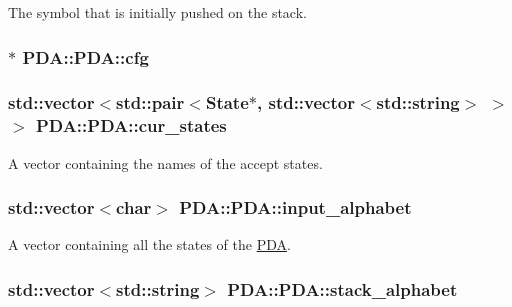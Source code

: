 \-The symbol that is initially pushed on the stack. 

\hypertarget{classPDA_1_1PDA_af62ce9c2fc33c22ac10cb94be5832cae}{
\subsubsection[{cfg}]{$\ast$ {\bf \-P\-D\-A\-::\-P\-D\-A\-::cfg}}}\label{d1/dc5/classPDA_1_1PDA_af62ce9c2fc33c22ac10cb94be5832cae}
\hypertarget{classPDA_1_1PDA_a0a940e3906fb9cfb1fa58fa8d329ab1b}{
\subsubsection[{cur\-\_\-states}]{\setlength{\rightskip}{0pt plus 5cm}std\-::vector$<$std\-::pair$<${\bf \-State}$\ast$, std\-::vector$<$std\-::string$>$ $>$ $>$ {\bf \-P\-D\-A\-::\-P\-D\-A\-::cur\-\_\-states}}}\label{d1/dc5/classPDA_1_1PDA_a0a940e3906fb9cfb1fa58fa8d329ab1b}


\-A vector containing the names of the accept states. 

\hypertarget{classPDA_1_1PDA_a54db260eece0bfe0d5aad0ef13f18a02}{
\subsubsection[{input\-\_\-alphabet}]{\setlength{\rightskip}{0pt plus 5cm}std\-::vector$<$char$>$ {\bf \-P\-D\-A\-::\-P\-D\-A\-::input\-\_\-alphabet}}}\label{d1/dc5/classPDA_1_1PDA_a54db260eece0bfe0d5aad0ef13f18a02}


\-A vector containing all the states of the \hyperlink{classPDA_1_1PDA}{\-P\-D\-A}. 

\hypertarget{classPDA_1_1PDA_a90a4f96e28003d5bfa4d67b4c7a191b5}{
\subsubsection[{stack\-\_\-alphabet}]{\setlength{\rightskip}{0pt plus 5cm}std\-::vector$<$std\-::string$>$ {\bf \-P\-D\-A\-::\-P\-D\-A\-::stack\-\_\-alphabet}}}\label{d1/dc5/classPDA_1_1PDA_a90a4f96e28003d5bfa4d67b4c7a191b5}


